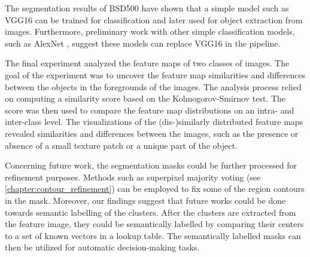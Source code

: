 The segmentation results of BSD500 have shown that a simple model such as VGG16 can be trained for classification and later used for object extraction from images. Furthermore, preliminary work with other simple classification models, such as AlexNet \parencite{krizhevsky2012imagenet}, suggest these models can replace VGG16 in the pipeline.

The final experiment analyzed the feature maps of two classes of images. The goal of the experiment was to uncover the feature map similarities and differences between the objects in the foregrounds of the images. The analysis process relied on computing a similarity score based on the Kolmogorov-Smirnov test. The score was then used to compare the feature map distributions on an intra- and inter-class level. The visualizations of the (dis-)similarly distributed feature maps revealed similarities and differences between the images, such as the presence or absence of a small texture patch or a unique part of the object.

Concerning future work, the segmentation masks could be further processed for refinement purposes. Methods such as superpixel majority voting (see \autoref{chapter:contour_refinement}) can be employed to fix some of the region contours in the mask. Moreover, our findings suggest that future works could be done towards semantic labelling of the clusters. After the clusters are extracted from the feature image, they could be semantically labelled by comparing their centers to a set of known vectors in a lookup table. The semantically labelled masks can then be utilized for automatic decision-making tasks.